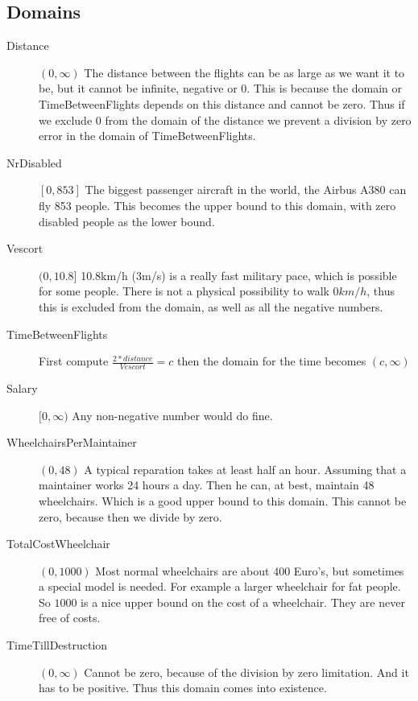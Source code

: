 \documentclass[a4paper, 11pt, notitlepage]{report}
\begin{document}
\subsection{Domains}
	\begin{description}
		\item[Distance] $(0,\infty)$ The distance between the flights can be as large as we want it to be, but it cannot be infinite, negative or 0. This is because the domain or TimeBetweenFlights depends on this distance and cannot be zero. Thus if we exclude 0 from the domain of the distance we prevent a division by zero error in the domain of TimeBetweenFlights.
		\item[NrDisabled] $[0,853 ]$ The biggest passenger aircraft in the world, the Airbus A380 can fly 853 people. This becomes the upper bound to this domain, with zero disabled people as the lower bound.   %
		\item[Vescort] $(0,10.8]$ 10.8km/h (3m/s) is a really fast military pace, which is possible for some people. There is not a physical possibility to walk $0km/h$, thus this is excluded from the domain, as well as all the negative numbers.
		\item[TimeBetweenFlights] First compute $\frac{2*distance}{Vescort} = c$ then the domain for the time becomes $(c,\infty)$ %
		\item[Salary] $[0,\infty)$ Any non-negative number would do fine.
		\item[WheelchairsPerMaintainer] $(0,48)$ A typical reparation takes at least half an hour. Assuming that a maintainer works 24 hours a day. Then he can, at best, maintain 48 wheelchairs. Which is a good upper bound to this domain. This cannot be zero, because then we divide by zero.
		\item[TotalCostWheelchair] $(0,1000)$ Most normal wheelchairs are about $400$ Euro's, but sometimes a special model is needed. For example a larger wheelchair for fat people. So $1000$ is a nice upper bound on the cost of a wheelchair. They are never free of costs. %
		\item[TimeTillDestruction] $(0,\infty)$ Cannot be zero, because of the division by zero limitation. And it has to be positive. Thus this domain comes into existence.
	\end{description}
	
	
\end{document}
